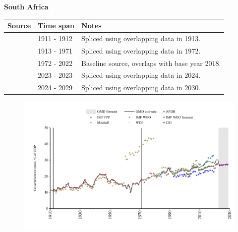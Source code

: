 \documentclass[12pt,a4paper,landscape]{article}
\begin{document}
\begin{adjustbox}{max totalsize={\paperwidth}{\paperheight},center}
\begin{minipage}[t][\textheight][t]{\textwidth}
\vspace*{0.5cm}
{}
\begin{center}
{\Large\bfseries South Africa}
\end{center}
\vspace{0.5cm}
\begin{table}[H]
\centering
\small
\begin{tabular}{|l|l|l|}
\hline
\textbf{Source} & \textbf{Time span} & \textbf{Notes} \\
\hline
\rowcolor{white}\cite{Mitchell}& 1911 - 1912 &Spliced using overlapping data in 1913.\\
\rowcolor{lightgray}\cite{IMF_FPP}& 1913 - 1971 &Spliced using overlapping data in 1972.\\
\rowcolor{white}\cite{WDI}& 1972 - 2022 &Baseline source, overlaps with base year 2018.\\
\rowcolor{lightgray}\cite{IMF_FPP}& 2023 - 2023 &Spliced using overlapping data in 2024.\\
\rowcolor{white}\cite{IMF_WEO_forecast}& 2024 - 2029 &Spliced using overlapping data in 2030.\\
\hline
\end{tabular}
\end{table}
\begin{figure}[H]
\centering
\includegraphics[width=\textwidth,height=0.6\textheight,keepaspectratio]{graphs/ZAF_govrev_GDP.pdf}
\end{figure}
\end{minipage}
\end{adjustbox}
\end{document}

